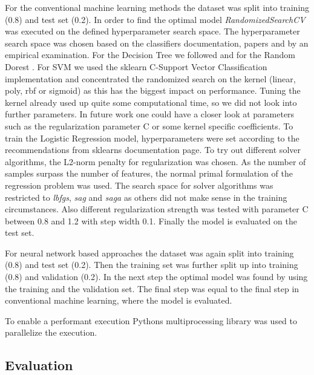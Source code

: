 For the conventional machine learning methods the dataset was split into training (0.8) and test set (0.2). In order to find the optimal model \textit{Randomized\-SearchCV} was executed on the defined hyperparameter search space. The hyperparameter search space was chosen based on the classifiers doc\-u\-men\-ta\-tion, papers and by an empirical examination. For the Decision Tree we followed \cite{mantovani2019empirical} and for the Random Dorest \cite{probstHyperparametersTuningStrategies2019}. For SVM we used the sklearn C-Support Vector Classification implementation and concentrated the randomized search on the kernel (linear, poly, rbf or sigmoid) as this has the biggest impact on performance. Tuning the kernel already used up quite some computational time, so we did not look into further parameters. In future work one could have a closer look at parameters such as the regularization parameter C or some kernel specific coefficients. To train the Logistic Regression model, hyperparameters were set according to the recommendations from sklearns documentation page. To try out different solver algorithms, the L2-norm penalty for regularization was chosen. As the number of samples surpass the number of features, the normal primal formulation of the regression problem was used. The search space for solver algorithms was restricted to \textit{lbfgs}, \textit{sag} and \textit{saga} as others did not make sense in the training circumstances. Also different regularization strength was tested with parameter C between 0.8 and 1.2 with step width 0.1. Finally the model is evaluated on the test set.

For neural network based approaches the dataset was again split into training (0.8) and test set (0.2). Then the training set was further split up into training (0.8) and validation (0.2). In the next step the optimal model was found by using the training and the validation set. The final step was equal to the final step in conventional machine learning, where the model is evaluated.

To enable a performant execution Pythons multiprocessing library was used to parallelize the execution.

\subsection{Evaluation}
\label{ch:approachE}

